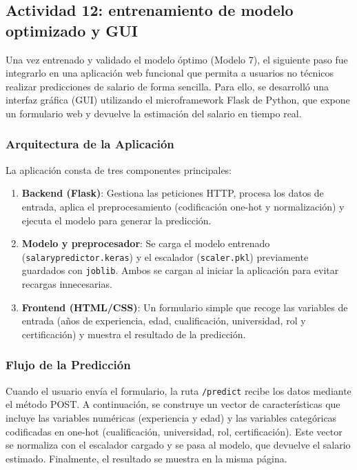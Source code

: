 \documentclass[12pt]{article}
\begin{document}
\subsection{Actividad 12: entrenamiento de modelo optimizado y GUI}

Una vez entrenado y validado el modelo óptimo (Modelo 7), el siguiente paso fue integrarlo en una aplicación web funcional que permita a usuarios no técnicos realizar predicciones de salario de forma sencilla. Para ello, se desarrolló una interfaz gráfica (GUI) utilizando el microframework Flask de Python, que expone un formulario web y devuelve la estimación del salario en tiempo real.

\subsubsection*{Arquitectura de la Aplicación}

La aplicación consta de tres componentes principales:

\begin{enumerate}
    \item \textbf{Backend (Flask)}: Gestiona las peticiones HTTP, procesa los datos de entrada, aplica el preprocesamiento (codificación one-hot y normalización) y ejecuta el modelo para generar la predicción.
    \item \textbf{Modelo y preprocesador}: Se carga el modelo entrenado (\texttt{salarypredictor.keras}) y el escalador (\texttt{scaler.pkl}) previamente guardados con \texttt{joblib}. Ambos se cargan al iniciar la aplicación para evitar recargas innecesarias.
    \item \textbf{Frontend (HTML/CSS)}: Un formulario simple que recoge las variables de entrada (años de experiencia, edad, cualificación, universidad, rol y certificación) y muestra el resultado de la predicción.
\end{enumerate}

\subsubsection*{Flujo de la Predicción}

Cuando el usuario envía el formulario, la ruta \texttt{/predict} recibe los datos mediante el método POST. A continuación, se construye un vector de características que incluye las variables numéricas (experiencia y edad) y las variables categóricas codificadas en one-hot (cualificación, universidad, rol, certificación). Este vector se normaliza con el escalador cargado y se pasa al modelo, que devuelve el salario estimado. Finalmente, el resultado se muestra en la misma página.
\end{document}
